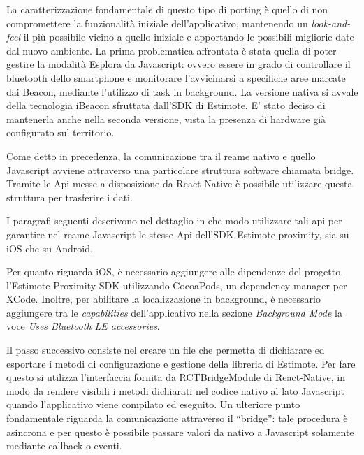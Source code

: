 La caratterizzazione fondamentale di questo tipo di porting è quello di non compromettere la funzionalità iniziale dell’applicativo, mantenendo un \emph{look-and-feel} il più possibile vicino a quello iniziale e apportando le possibili migliorie date dal nuovo ambiente. La prima problematica affrontata è stata quella di poter gestire la modalità Esplora da Javascript: ovvero essere in grado di controllare il bluetooth dello smartphone e monitorare l’avvicinarsi a specifiche aree marcate dai Beacon, mediante l'utilizzo di task in background. La versione nativa si avvale della tecnologia iBeacon sfruttata dall'SDK di Estimote. E' stato deciso di mantenerla anche nella seconda versione, vista la presenza di hardware già configurato sul territorio.  \vspace{5mm}

Come detto in precedenza, la comunicazione tra il reame nativo e quello Javascript avviene attraverso una particolare struttura software chiamata bridge. Tramite le Api messe a disposizione da React-Native è possibile utilizzare questa struttura per trasferire i dati. \vspace{5mm}

I paragrafi seguenti descrivono nel dettaglio in che modo utilizzare tali api per garantire nel reame Javascript le stesse Api dell’SDK Estimote proximity, sia su iOS che su Android.\vspace{5mm}

Per quanto riguarda iOS, è necessario aggiungere alle dipendenze del progetto, l'Estimote Proximity SDK utilizzando CocoaPods, un dependency manager per XCode. Inoltre, per abilitare la localizzazione in background, è necessario aggiungere tra le \emph{capabilities} dell’applicativo nella sezione \emph{Background Mode} la voce \emph{Uses Bluetooth LE accessories}. \vspace{5mm}

Il passo successivo consiste nel creare un file che permetta di dichiarare ed esportare i metodi di configurazione e gestione della libreria di Estimote. Per fare questo si utilizza l’interfaccia fornita da RCTBridgeModule di React-Native, in modo da rendere visibili i metodi dichiarati nel codice nativo al lato Javascript quando l'applicativo viene compilato ed eseguito. Un ulteriore punto fondamentale riguarda la comunicazione attraverso il “bridge”: tale procedura è asincrona e per questo è possibile passare valori da nativo a Javascript solamente mediante callback o eventi. \vspace{5mm}

